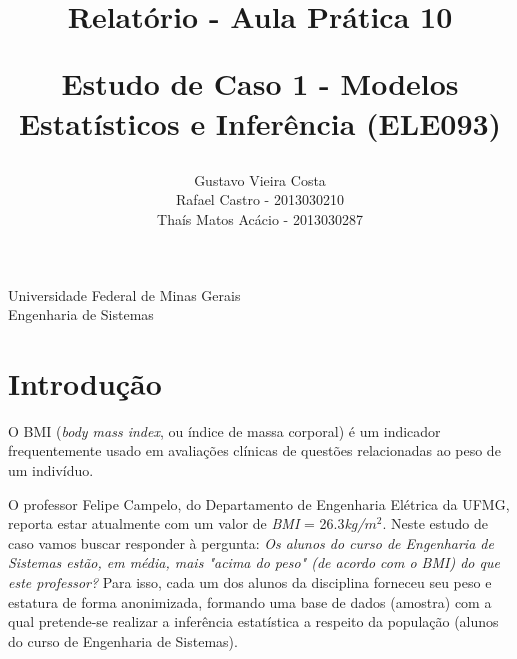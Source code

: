 \documentclass[12pt, a4paper]{article}
\title{
	Relatório - Aula Prática 10\\[2cm]
	\begin{large}
		Estudo de Caso 1 - Modelos Estatísticos e Inferência (ELE093)
	\end{large}	}
\author{Gustavo Vieira Costa\\Rafael Castro - 2013030210\\Thaís Matos Acácio - 2013030287}
\date{}
\begin{document}
	\maketitle
	
	\vspace*{-7.5cm}
	{\bf
		\begin{center}
			{\large
				\hspace*{0cm}Universidade Federal de Minas Gerais} \\
			\hspace*{0cm}Engenharia de Sistemas  \\
		\end{center}
	}
	\vspace*{5cm}
	
	\section{Introdução}
		O BMI (\textit{body mass index}, ou índice de massa corporal) é um indicador frequentemente usado em avaliações clínicas de questões relacionadas ao peso de um indivíduo.
		
		O professor Felipe Campelo, do Departamento de Engenharia Elétrica da UFMG, reporta estar atualmente com um valor de \textit{BMI} = 26.3\textit{kg/$m^{2}$}. Neste estudo de caso vamos buscar responder à pergunta: \textit{Os alunos do curso de Engenharia de Sistemas estão, em média, mais "acima do peso" (de acordo com o BMI) do que este professor?} Para isso, cada um dos alunos da disciplina forneceu seu peso e estatura de forma anonimizada, formando uma base de dados (amostra) com a qual pretende-se realizar a inferência estatística a respeito da população (alunos do curso de Engenharia de Sistemas).
		
\end{document}

